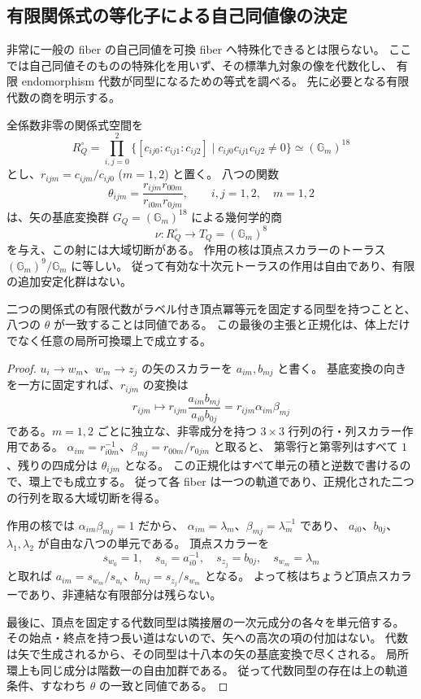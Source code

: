 \subsection{有限関係式の等化子による自己同値像の決定}
\label{sec:generic-aut-equalizers}

非常に一般の fiber の自己同値を可換 fiber へ特殊化できるとは限らない。
ここでは自己同値そのものの特殊化を用いず、その標準九対象の像を代数化し、
有限 endomorphism 代数が同型になるための等式を調べる。
先に必要となる有限代数の商を明示する。

\begin{lemma}[全係数非零の関係式の明示的商]
\label{lem:aou-fullsupport-torus}
全係数非零の関係式空間を
\[
 R_Q^\circ=\prod_{i,j=0}^2
 \{[c_{ij0}:c_{ij1}:c_{ij2}]\mid c_{ij0}c_{ij1}c_{ij2}\ne0\}
 \simeq(\mathbb G_m)^{18}
\]
とし、$r_{ijm}=c_{ijm}/c_{ij0}$ ($m=1,2$) と置く。
八つの関数
\begin{equation}\label{eq:aou-torus-invariants}
 \theta_{ijm}=
 \frac{r_{ijm}r_{00m}}{r_{i0m}r_{0jm}},
 \qquad i,j=1,2,\quad m=1,2
\end{equation}
は、矢の基底変換群 $G_Q=(\mathbb G_m)^{18}$ による幾何学的商
\[
 \nu:R_Q^\circ\longrightarrow T_Q=(\mathbb G_m)^8
\]
を与え、この射には大域切断がある。
作用の核は頂点スカラーのトーラス $(\mathbb G_m)^9/\mathbb G_m$ に等しい。
従って有効な十次元トーラスの作用は自由であり、有限の追加安定化群はない。

二つの関係式の有限代数がラベル付き頂点冪等元を固定する同型を持つことと、
八つの $\theta$ が一致することは同値である。
この最後の主張と正規化は、体上だけでなく任意の局所可換環上で成立する。
\end{lemma}
\begin{proof}
$u_i\to w_m$、$w_m\to z_j$ の矢のスカラーを $a_{im},b_{mj}$ と書く。
基底変換の向きを一方に固定すれば、$r_{ijm}$ の変換は
\[
 r_{ijm}\longmapsto
 r_{ijm}\frac{a_{im}b_{mj}}{a_{i0}b_{0j}}
 =r_{ijm}\alpha_{im}\beta_{mj}
\]
である。$m=1,2$ ごとに独立な、非零成分を持つ $3\times3$ 行列の行・列スカラー作用である。
$\alpha_{im}=r_{i0m}^{-1}$、$\beta_{mj}=r_{00m}/r_{0jm}$ と取ると、
第零行と第零列はすべて $1$、残りの四成分は $\theta_{ijm}$ となる。
この正規化はすべて単元の積と逆数で書けるので、環上でも成立する。
従って各 fiber は一つの軌道であり、正規化された二つの行列を取る大域切断を得る。

作用の核では $\alpha_{im}\beta_{mj}=1$ だから、
$\alpha_{im}=\lambda_m$、$\beta_{mj}=\lambda_m^{-1}$ であり、
$a_{i0}$、$b_{0j}$、$\lambda_1,\lambda_2$ が自由な八つの単元である。
頂点スカラーを
\[
 s_{w_0}=1,\quad s_{u_i}=a_{i0}^{-1},\quad
 s_{z_j}=b_{0j},\quad s_{w_m}=\lambda_m
\]
と取れば $a_{im}=s_{w_m}/s_{u_i}$、$b_{mj}=s_{z_j}/s_{w_m}$ となる。
よって核はちょうど頂点スカラーであり、非連結な有限部分は残らない。

最後に、頂点を固定する代数同型は隣接層の一次元成分の各々を単元倍する。
その始点・終点を持つ長い道はないので、矢への高次の項の付加はない。
代数は矢で生成されるから、その同型は十八本の矢の基底変換で尽くされる。
局所環上も同じ成分は階数一の自由加群である。
従って代数同型の存在は上の軌道条件、すなわち $\theta$ の一致と同値である。
\end{proof}

